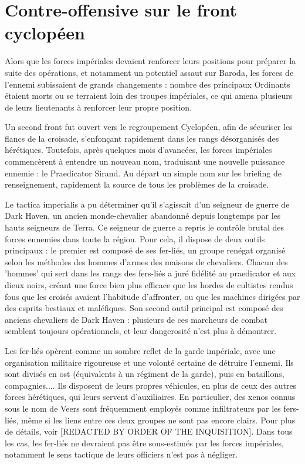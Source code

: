 \documentclass[10pt,a4paper]{book}
\newcommand{\front}{front cyclopéen }
\begin{document}
\section{Contre-offensive sur le  \front}
Alors que les forces impériales devaient renforcer leurs positions pour préparer la suite des opérations, et notamment un potentiel assaut sur Baroda, les forces de l'ennemi subissaient de grands changements : nombre des principaux Ordinants étaient morts ou se terraient loin des troupes impériales, ce qui amena plusieurs de leurs lieutenants à renforcer leur propre position.

Un second front fut ouvert vers le regroupement Cyclopéen, afin de sécuriser les flancs de la croisade, s'enfonçant rapidement dans les rangs désorganisés des hérétiques. Toutefois, après quelques mois d'avancées, les forces impériales commencèrent à entendre un nouveau nom, traduisant une nouvelle puissance ennemie : le Praedicator Sirand. Au départ un simple nom sur les briefing de renseignement, rapidement la source de tous les problèmes de la croisade.

Le tactica imperialis a pu déterminer qu'il s'agissait d'un seigneur de guerre de Dark Haven, un ancien monde-chevalier abandonné depuis longtemps par les hauts seigneurs de Terra. Ce seigneur de guerre a repris le contrôle brutal des forces ennemies dans toute la région. Pour cela, il dispose de deux outils principaux : le premier est composé de ses fer-liés, un groupe renégat organisé selon les méthodes des hommes d'armes des maisons de chevaliers. Chacun des 'hommes' qui sert dans les rangs des fers-liés a juré fidélité au praedicator et aux dieux noirs, créant une force bien plus efficace que les hordes de cultistes rendus fous que les croisés avaient l'habitude d'affronter, ou que les machines dirigées par des esprits bestiaux et maléfiques. Son second outil principal est composé des anciens chevaliers de Dark Haven : plusieurs de ces marcheurs de combat semblent toujours opérationnels, et leur dangerosité n'est plus à démontrer.

Les fer-liés opèrent comme un sombre reflet de la garde impériale, avec une organisation militaire rigoureuse et une volonté certaine de détruire l'ennemi. Ils sont divisés en ost (équivalents à un régiment de la garde), puis en bataillons, compagnies.... Ils disposent de leurs propres véhicules, en plus de ceux des autres forces hérétiques, qui leurs servent d'auxiliaires. En particulier, des xenos connus sous le nom de Veers sont fréquemment employés comme infiltrateurs par les fers-liés, même si les liens entre ces deux groupes ne sont pas encore clairs. Pour plus de détails, voir [REDACTED BY ORDER OF THE INQUISITION]. Dans tous les cas, les fer-liés ne devraient pas être sous-estimés par les forces impériales, notamment le sens tactique de leurs officiers n'est pas à négliger.
\end{document}
